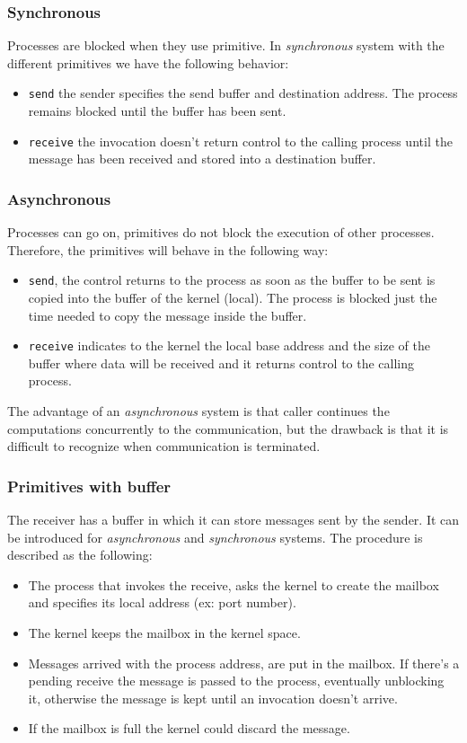\subsubsection{Synchronous}
Processes are blocked when they use primitive. In \textit{synchronous} system with the different primitives we have the following behavior:
\begin{itemize}
    \item \verb!send! the sender specifies the send buffer and destination address. The process remains blocked until the buffer has been sent. 
    \item \verb!receive! the invocation doesn't return control to the calling process until the message has been received and stored into a destination buffer.
\end{itemize}
\subsubsection{Asynchronous}
Processes can go on, primitives do not block the execution of other processes. Therefore, the primitives will behave in the following way:  
\begin{itemize}
    \item \verb!send!, the control returns to the process as soon as the buffer to be sent is copied into the buffer of the kernel (local). The process is blocked just the time needed to copy the message inside the buffer. 
    \item \verb!receive! indicates to the kernel the local base address and the size of the buffer where data will be received and it returns control to the calling process.
\end{itemize}
The advantage of an \textit{asynchronous} system is that caller continues the computations concurrently to the communication, but the drawback is that it is difficult to recognize when communication is terminated.
\subsubsection{Primitives with buffer}
The receiver has a buffer in which it can store messages sent by the sender. It can be introduced for \textit{asynchronous} and \textit{synchronous} systems. The procedure is described as the following:
\begin{itemize}
    \item The process that invokes the receive, asks the kernel to create the mailbox and specifies its local address (ex: port number).
    \item The kernel keeps the mailbox in the kernel space.
    \item Messages arrived with the process address, are put in the mailbox. If there's a pending receive the message is passed to the process, eventually unblocking it, otherwise the message is kept until an invocation doesn't arrive.
    \item If the mailbox is full the kernel could discard the message. 
\end{itemize}

